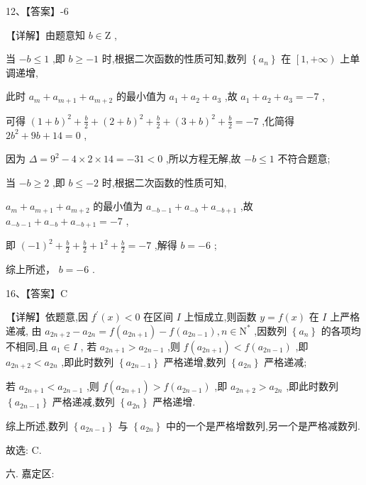 \documentclass[10pt]{article}
\begin{document}
12、【答案】-6

【详解】由题意知 \(b \in  \mathrm{Z}\) ,

当 \(- b \leq  1\) ,即 \(b \geq   - 1\) 时,根据二次函数的性质可知,数列 \(\left\{  {a}_{n}\right\}\) 在 \(\left\lbrack  {1, + \infty }\right)\) 上单调递增,

此时 \({a}_{m} + {a}_{m + 1} + {a}_{m + 2}\) 的最小值为 \({a}_{1} + {a}_{2} + {a}_{3}\) ,故 \({a}_{1} + {a}_{2} + {a}_{3} =  - 7\) ,

可得 \({\left( 1 + b\right) }^{2} + \frac{b}{2} + {\left( 2 + b\right) }^{2} + \frac{b}{2} + {\left( 3 + b\right) }^{2} + \frac{b}{2} =  - 7\) ,化简得 \(2{b}^{2} + {9b} + {14} = 0\) ,

因为 \(\Delta  = {9}^{2} - 4 \times  2 \times  {14} =  - {31} < 0\) ,所以方程无解,故 \(- b \leq  1\) 不符合题意;

当 \(- b \geq  2\) ,即 \(b \leq   - 2\) 时,根据二次函数的性质可知,

\({a}_{m} + {a}_{m + 1} + {a}_{m + 2}\) 的最小值为 \({a}_{-b - 1} + {a}_{-b} + {a}_{-b + 1}\) ,故 \({a}_{-b - 1} + {a}_{-b} + {a}_{-b + 1} =  - 7\) ,

即 \({\left( -1\right) }^{2} + \frac{b}{2} + \frac{b}{2} + {1}^{2} + \frac{b}{2} =  - 7\) ,解得 \(b =  - 6\) ;

综上所述， \(b =  - 6\) .

16、【答案】C

【详解】依题意,因 \({f}^{\prime }\left( x\right)  < 0\) 在区间 \(I\) 上恒成立,则函数 \(y = f\left( x\right)\) 在 \(I\) 上严格递减, 由 \({a}_{{2n} + 2} - {a}_{2n} = f\left( {a}_{{2n} + 1}\right)  - f\left( {a}_{{2n} - 1}\right) ,n \in  {\mathrm{N}}^{ * }\) ,因数列 \(\left\{  {a}_{n}\right\}\) 的各项均不相同,且 \({a}_{1} \in  I\) , 若 \({a}_{{2n} + 1} > {a}_{{2n} - 1}\) ,则 \(f\left( {a}_{{2n} + 1}\right)  < f\left( {a}_{{2n} - 1}\right)\) ,即 \({a}_{{2n} + 2} < {a}_{2n}\) ,即此时数列 \(\left\{  {a}_{{2n} - 1}\right\}\) 严格递增,数列 \(\left\{  {a}_{2n}\right\}\) 严格递减;

若 \({a}_{{2n} + 1} < {a}_{{2n} - 1}\) ,则 \(f\left( {a}_{{2n} + 1}\right)  > f\left( {a}_{{2n} - 1}\right)\) ,即 \({a}_{{2n} + 2} > {a}_{2n}\) ,即此时数列 \(\left\{  {a}_{{2n} - 1}\right\}\) 严格递减,数列 \(\left\{  {a}_{2n}\right\}\) 严格递增.

综上所述,数列 \(\left\{  {a}_{{2n} - 1}\right\}\) 与 \(\left\{  {a}_{2n}\right\}\) 中的一个是严格增数列,另一个是严格减数列.

故选: C.

六. 嘉定区:
\end{document}
